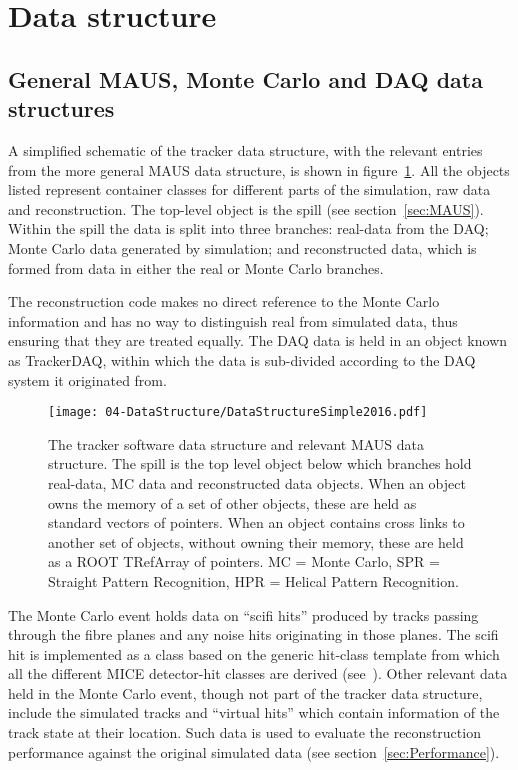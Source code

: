\section{Data structure}
\label{sec:DataStructure}

\subsection{General MAUS, Monte Carlo and DAQ data structures}
\label{subsec:GeneralDataStructure}
A simplified schematic of the tracker data structure, with the relevant entries from the more general MAUS data structure, is shown in figure~\ref{figureDataStructure}.  All the objects listed represent container classes for different parts of the simulation, raw data and reconstruction.  The top-level object is the spill (see section~\ref{sec:MAUS}).  Within the spill the data is split into three branches: real-data from the DAQ; Monte Carlo data generated by simulation; and reconstructed data, which is formed from data in either the real or Monte Carlo branches. 

The reconstruction code makes no direct reference to the Monte Carlo information and has no way to distinguish real from simulated data, thus ensuring that they are treated equally.  The DAQ data is held in an object known as TrackerDAQ, within which the data is sub-divided according to the DAQ system it originated from.%

\begin{figure}[bt]
  \begin{center}
    \texttt{[image: 04-DataStructure/DataStructureSimple2016.pdf]}
    \caption{\label{figureDataStructure}The tracker software data structure and relevant MAUS data structure.  The spill is the top level object below which branches hold real-data, MC data and reconstructed data objects. When an object owns the memory of a set of other objects, these are held as standard vectors of pointers. When an object contains cross links to another set of objects, without owning their memory, these are held as a ROOT TRefArray of pointers. MC = Monte Carlo, SPR = Straight Pattern Recognition, HPR = Helical Pattern Recognition.}
  \end{center}
\end{figure}

The Monte Carlo event holds data on ``scifi hits'' produced by tracks passing through the fibre planes and any noise hits originating in those planes. The scifi hit is implemented as a class based on the generic hit-class template from which all the different MICE detector-hit classes are derived (see~\cite{MausIPAC11}).  Other relevant data held in the Monte Carlo event, though not part of the tracker data structure, include the simulated tracks and ``virtual hits'' which contain information of the track state at their location. Such data is used to evaluate the reconstruction performance against the original simulated data (see section~\ref{sec:Performance}).

